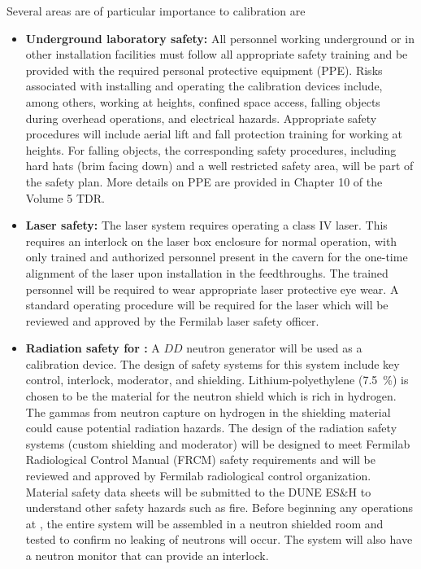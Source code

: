 Several areas are of particular importance to calibration are
\begin{itemize}
\item {\bf Underground laboratory safety:} All personnel working underground or in other installation facilities must follow all appropriate safety training and be provided with the required personal protective equipment (PPE). Risks associated with installing and operating the calibration devices include, among others, working at heights, confined space access, falling objects during overhead operations, and electrical hazards. Appropriate safety procedures will include aerial lift and fall protection training for working at heights. For falling objects, the corresponding safety procedures, including hard hats (brim facing down) and a well restricted safety area, will be part of the safety plan. More details on PPE are provided in Chapter 10 of the Volume 5 TDR.

\item {\bf Laser safety:} The laser system requires operating a class IV laser\cite{FNAL:Class4Lasers,CERN:Class4Lasers}. This requires an interlock on the laser box enclosure for normal operation, with only trained and authorized personnel present in the cavern for the one-time alignment of the laser upon installation in the feedthroughs. The trained personnel will be required to wear appropriate laser protective eye wear. A standard operating procedure will be required for the laser which will be reviewed and approved by the Fermilab laser safety officer. 

\item {\bf Radiation safety for :} A $DD$ neutron generator will be used as a calibration device. The design of safety systems for this system include key control, interlock, moderator, and shielding. Lithium-polyethylene (\SI{7.5}{\%}) is chosen to be the material for the neutron shield which is rich in hydrogen. The gammas from neutron capture on hydrogen in the shielding material could cause potential radiation hazards. The design of the radiation safety systems (custom shielding and moderator) will be designed to meet Fermilab Radiological Control Manual (FRCM) safety requirements and will be reviewed and approved by Fermilab radiological control organization. Material safety data sheets will be submitted to the DUNE ES\&H to understand other safety hazards such as fire. Before beginning any operations at , the entire system will be assembled in a neutron shielded room and tested to confirm no leaking of neutrons will occur. The system will also have a neutron monitor that can provide an interlock. 


\end{itemize}
